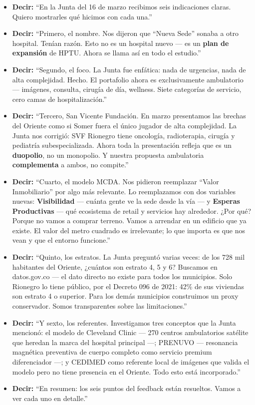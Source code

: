 \documentclass[11pt, a4paper]{article}
\newcommand{\say}[1]{\textcolor{hptu}{\textbf{Decir:}} ``#1''}
\begin{document}
\begin{itemize}[leftmargin=0.5cm, itemsep=6pt]

  \item \say{En la Junta del 16 de marzo recibimos seis indicaciones claras. Quiero mostrarles qué hicimos con cada una.}

  \item \say{Primero, el nombre. Nos dijeron que ``Nueva Sede'' sonaba a otro hospital. Tenían razón. Esto no es un hospital nuevo --- es un \textbf{plan de expansión} de HPTU. Ahora se llama así en todo el estudio.}

  \item \say{Segundo, el foco. La Junta fue enfática: nada de urgencias, nada de alta complejidad. Hecho. El portafolio ahora es exclusivamente ambulatorio --- imágenes, consulta, cirugía de día, wellness. Siete categorías de servicio, cero camas de hospitalización.}

  \item \say{Tercero, San Vicente Fundación. En marzo presentamos las brechas del Oriente como si Somer fuera el único jugador de alta complejidad. La Junta nos corrigió: SVF Rionegro tiene oncología, radioterapia, cirugía y pediatría subespecializada. Ahora toda la presentación refleja que es un \textbf{duopolio}, no un monopolio. Y nuestra propuesta ambulatoria \textbf{complementa} a ambos, no compite.}

  \item \say{Cuarto, el modelo MCDA. Nos pidieron reemplazar ``Valor Inmobiliario'' por algo más relevante. Lo reemplazamos con dos variables nuevas: \textbf{Visibilidad} --- cuánta gente ve la sede desde la vía --- y \textbf{Esperas Productivas} --- qué ecosistema de retail y servicios hay alrededor. ¿Por qué? Porque no vamos a comprar terreno. Vamos a arrendar en un edificio que ya existe. El valor del metro cuadrado es irrelevante; lo que importa es que nos vean y que el entorno funcione.}

  \item \say{Quinto, los estratos. La Junta preguntó varias veces: de los 728 mil habitantes del Oriente, ¿cuántos son estrato 4, 5 y 6? Buscamos en datos.gov.co --- el dato directo no existe para todos los municipios. Solo Rionegro lo tiene público, por el Decreto 096 de 2021: 42\% de sus viviendas son estrato 4 o superior. Para los demás municipios construimos un proxy conservador. Somos transparentes sobre las limitaciones.}

  \item \say{Y sexto, los referentes. Investigamos tres conceptos que la Junta mencionó: el modelo de Cleveland Clinic --- 270 centros ambulatorios satélite que heredan la marca del hospital principal ---; PRENUVO --- resonancia magnética preventiva de cuerpo completo como servicio premium diferenciador ---; y CEDIMED como referente local de imágenes que valida el modelo pero no tiene presencia en el Oriente. Todo esto está incorporado.}

  \item \say{En resumen: los seis puntos del feedback están resueltos. Vamos a ver cada uno en detalle.}

\end{itemize}
\end{document}
